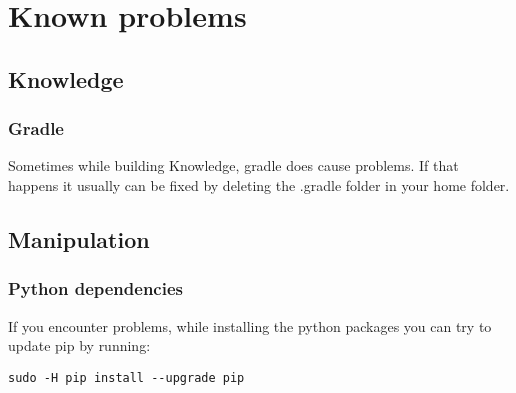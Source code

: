 \documentclass[main.tex]{subfiles}
\begin{document}
	\section{Known problems}
	
	\subsection{Knowledge}
	\subsubsection{Gradle}
	Sometimes while building Knowledge, gradle does cause problems.
	If that happens it usually can be fixed by deleting the .gradle folder in your home folder.
	
	\subsection{Manipulation}
	\subsubsection{Python dependencies}
	If you encounter problems, while installing the python packages you can try to update pip by running:
	\begin{lstlisting}
sudo -H pip install --upgrade pip
\end{lstlisting}	
	
\end{document}
